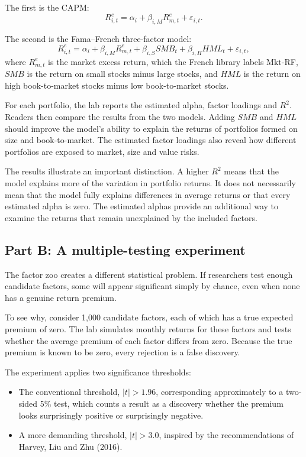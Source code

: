 The first is the CAPM:
\begin{equation}
  R^{e}_{i,t}
  = \alpha_i+\beta_{i,M}R^{e}_{m,t}+\varepsilon_{i,t}.
  \label{eq:04-lab-capm}
\end{equation}

The second is the Fama--French three-factor model:
\begin{equation}
  R^{e}_{i,t}
  = \alpha_i+\beta_{i,M}R^{e}_{m,t}
  +\beta_{i,S}SMB_t
  +\beta_{i,H}HML_t+\varepsilon_{i,t},
  \label{eq:04-lab-ff3}
\end{equation}
where $R^{e}_{m,t}$ is the market excess return, which the French library labels Mkt-RF, $SMB$ is the return on small stocks minus large stocks, and $HML$ is the return on high book-to-market stocks minus low book-to-market stocks.

For each portfolio, the lab reports the estimated alpha, factor loadings and $R^2$. Readers then compare the results from the two models. Adding $SMB$ and $HML$ should improve the model's ability to explain the returns of portfolios formed on size and book-to-market. The estimated factor loadings also reveal how different portfolios are exposed to market, size and value risks.

The results illustrate an important distinction. A higher $R^2$ means that the model explains more of the variation in portfolio returns. It does not necessarily mean that the model fully explains differences in average returns or that every estimated alpha is zero. The estimated alphas provide an additional way to examine the returns that remain unexplained by the included factors.

\subsection*{Part B: A multiple-testing experiment}

The factor zoo creates a different statistical problem. If researchers test enough candidate factors, some will appear significant simply by chance, even when none has a genuine return premium.

To see why, consider 1,000 candidate factors, each of which has a true expected premium of zero. The lab simulates monthly returns for these factors and tests whether the average premium of each factor differs from zero. Because the true premium is known to be zero, every rejection is a false discovery.

The experiment applies two significance thresholds:
\begin{itemize}
  \item The conventional threshold, $|t|>1.96$, corresponding approximately to a two-sided 5\% test, which counts a result as a discovery whether the premium looks surprisingly positive or surprisingly negative.
  \item A more demanding threshold, $|t|>3.0$, inspired by the recommendations of Harvey, Liu and Zhu (2016).
\end{itemize}

